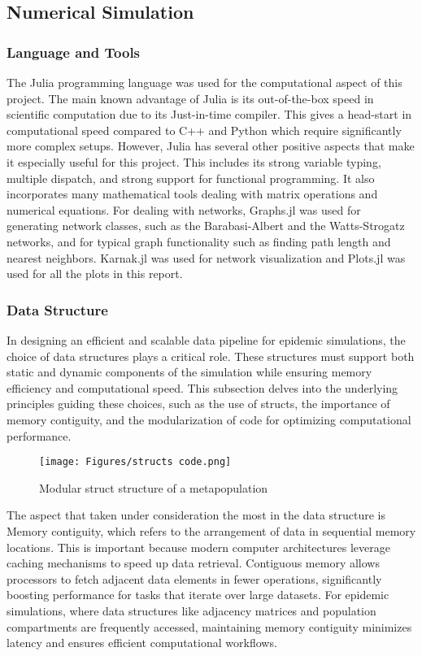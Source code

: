 \subsection{Numerical Simulation}
\subsubsection{Language and Tools}
The Julia programming language was used for the computational aspect of this project. The main known advantage of Julia is its out-of-the-box speed in scientific computation due to its  Just-in-time compiler. This gives a head-start in computational speed compared to C++ and Python which require significantly more complex setups. However, Julia has several other positive aspects that make it especially useful for this project. This includes its strong variable typing, multiple dispatch, and strong support for functional programming. It also incorporates many mathematical tools dealing with matrix operations and numerical equations. For dealing with networks, Graphs.jl was used for generating network classes, such as the Barabasi-Albert and the Watts-Strogatz networks, and for typical graph functionality such as finding path length and nearest neighbors. Karnak.jl was used for network visualization and Plots.jl was used for all the plots in this report.
\subsubsection{Data Structure}
In designing an efficient and scalable data pipeline for epidemic simulations, the choice of data structures plays a critical role. These structures must support both static and dynamic components of the simulation while ensuring memory efficiency and computational speed. This subsection delves into the underlying principles guiding these choices, such as the use of structs, the importance of memory contiguity, and the modularization of code for optimizing computational performance.\\

\begin{figure}
	\centering
	\texttt{[image: Figures/structs code.png]}
	\caption{\small Modular struct structure of a metapopulation}
\end{figure}

The aspect that taken under consideration the most in the data structure is Memory contiguity, which refers to the arrangement of data in sequential memory locations. This is important because modern computer architectures leverage caching mechanisms to speed up data retrieval. Contiguous memory allows processors to fetch adjacent data elements in fewer operations, significantly boosting performance for tasks that iterate over large datasets. For epidemic simulations, where data structures like adjacency matrices and population compartments are frequently accessed, maintaining memory contiguity minimizes latency and ensures efficient computational workflows.\\

